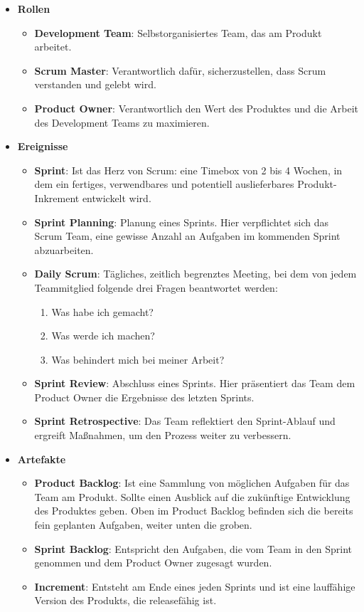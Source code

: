 \begin{itemize}
  \item \textbf{Rollen}
  \begin{itemize}
    \item \textbf{Development Team}: Selbstorganisiertes Team, das am Produkt arbeitet.
    \item \textbf{Scrum Master}: Verantwortlich dafür, sicherzustellen, dass Scrum verstanden und gelebt wird.
    \item \textbf{Product Owner}: Verantwortlich den Wert des Produktes und die Arbeit des Development Teams zu maximieren.
  \end{itemize}
  \item \textbf{Ereignisse}
  \begin{itemize}
    \item \textbf{Sprint}: Ist das Herz von Scrum: eine Timebox von 2 bis 4 Wochen, in dem ein fertiges, verwendbares und potentiell auslieferbares Produkt-Inkrement entwickelt wird.
    \item \textbf{Sprint Planning}: Planung eines Sprints. Hier verpflichtet sich das Scrum Team, eine gewisse Anzahl an Aufgaben im kommenden Sprint abzuarbeiten.
    \item \textbf{Daily Scrum}: Tägliches, zeitlich begrenztes Meeting, bei dem von jedem Teammitglied folgende drei Fragen beantwortet werden:
    \begin{enumerate}
      \item Was habe ich gemacht?
      \item Was werde ich machen?
      \item Was behindert mich bei meiner Arbeit?
    \end{enumerate}
    \item \textbf{Sprint Review}: Abschluss eines Sprints. Hier präsentiert das Team dem Product Owner die Ergebnisse des letzten Sprints.
    \item \textbf{Sprint Retrospective}: Das Team reflektiert den Sprint-Ablauf und ergreift Maßnahmen, um den Prozess weiter zu verbessern.
  \end{itemize}
  \item \textbf{Artefakte}
  \begin{itemize}
    \item \textbf{Product Backlog}: Ist eine Sammlung von möglichen Aufgaben für das Team am Produkt. Sollte einen Ausblick auf die zukünftige Entwicklung des Produktes geben. Oben im Product Backlog befinden sich die bereits fein geplanten Aufgaben, weiter unten die groben.
    \item \textbf{Sprint Backlog}: Entspricht den Aufgaben, die vom Team in den Sprint genommen und dem Product Owner zugesagt wurden.
    \item \textbf{Increment}: Entsteht am Ende eines jeden Sprints und ist eine lauffähige Version des Produkts, die releasefähig ist.
  \end{itemize}
\end{itemize}

